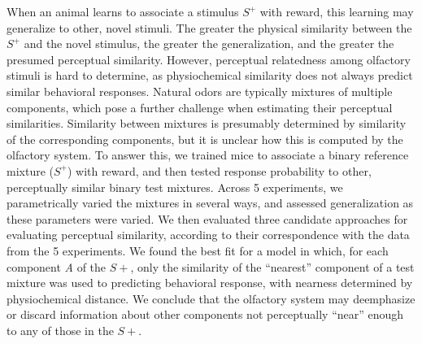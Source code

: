 When an animal learns to associate a stimulus $S^+$ with reward, this learning may generalize to other, novel stimuli. 
The greater the physical similarity between the $S^+$ and the novel stimulus, the greater the generalization, and the greater the presumed perceptual similarity. 
However, perceptual relatedness among olfactory stimuli is hard to determine, as physiochemical similarity does not always predict similar behavioral responses. 
Natural odors are typically mixtures of multiple components, which pose a further challenge when estimating their perceptual similarities.  
Similarity between mixtures is presumably determined by similarity of the corresponding components, but it is unclear how this is computed by the olfactory system.  
To answer this, we trained mice to associate a binary reference mixture ($S^+$) with reward, and then tested response probability to other, perceptually similar binary test mixtures.  
Across 5 experiments, we parametrically varied the mixtures in several ways, and assessed generalization as these parameters were varied.  
We then evaluated three candidate approaches for evaluating perceptual similarity, according to their correspondence with the data from the 5 experiments.  
We found the best fit for a model in which, for each component \textit{A} of the $S+$, only the similarity of the ``nearest'' component  of a test mixture was used to predicting behavioral response, with nearness determined by physiochemical distance.  
We conclude that the olfactory system may deemphasize or discard information about other components not perceptually ``near'' enough to any of those in the $S+$.